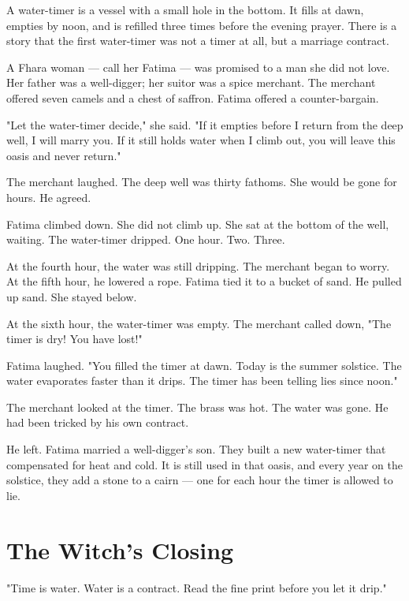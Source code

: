 \documentclass[10pt,twoside]{book}
\begin{document}
A water-timer is a vessel with a small hole in the bottom. It fills at dawn, empties by noon, and is refilled three times before the evening prayer. There is a story that the first water-timer was not a timer at all, but a marriage contract.

A Fhara woman --- call her Fatima --- was promised to a man she did not love. Her father was a well-digger; her suitor was a spice merchant. The merchant offered seven camels and a chest of saffron. Fatima offered a counter-bargain.

"Let the water-timer decide," she said. "If it empties before I return from the deep well, I will marry you. If it still holds water when I climb out, you will leave this oasis and never return."

The merchant laughed. The deep well was thirty fathoms. She would be gone for hours. He agreed.

Fatima climbed down. She did not climb up. She sat at the bottom of the well, waiting. The water-timer dripped. One hour. Two. Three.

At the fourth hour, the water was still dripping. The merchant began to worry. At the fifth hour, he lowered a rope. Fatima tied it to a bucket of sand. He pulled up sand. She stayed below.

At the sixth hour, the water-timer was empty. The merchant called down, "The timer is dry! You have lost!"

Fatima laughed. "You filled the timer at dawn. Today is the summer solstice. The water evaporates faster than it drips. The timer has been telling lies since noon."

The merchant looked at the timer. The brass was hot. The water was gone. He had been tricked by his own contract.

He left. Fatima married a well-digger's son. They built a new water-timer that compensated for heat and cold. It is still used in that oasis, and every year on the solstice, they add a stone to a cairn --- one for each hour the timer is allowed to lie.

\section*{The Witch's Closing}
"Time is water. Water is a contract. Read the fine print before you let it drip."
\end{document}
